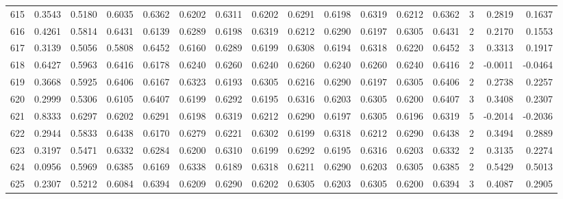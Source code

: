 \begin{tabular}{lrrrrrrrrrrrrrrr}
615 &      0.3543 &  0.5180 &  0.6035 &  0.6362 &  0.6202 &  0.6311 &  0.6202 &  0.6291 &  0.6198 &  0.6319 &   0.6212 &     0.6362 &      3 &                    0.2819 &                     0.1637 \\
616 &      0.4261 &  0.5814 &  0.6431 &  0.6139 &  0.6289 &  0.6198 &  0.6319 &  0.6212 &  0.6290 &  0.6197 &   0.6305 &     0.6431 &      2 &                    0.2170 &                     0.1553 \\
617 &      0.3139 &  0.5056 &  0.5808 &  0.6452 &  0.6160 &  0.6289 &  0.6199 &  0.6308 &  0.6194 &  0.6318 &   0.6220 &     0.6452 &      3 &                    0.3313 &                     0.1917 \\
618 &      0.6427 &  0.5963 &  0.6416 &  0.6178 &  0.6240 &  0.6260 &  0.6240 &  0.6260 &  0.6240 &  0.6260 &   0.6240 &     0.6416 &      2 &                   -0.0011 &                    -0.0464 \\
619 &      0.3668 &  0.5925 &  0.6406 &  0.6167 &  0.6323 &  0.6193 &  0.6305 &  0.6216 &  0.6290 &  0.6197 &   0.6305 &     0.6406 &      2 &                    0.2738 &                     0.2257 \\
620 &      0.2999 &  0.5306 &  0.6105 &  0.6407 &  0.6199 &  0.6292 &  0.6195 &  0.6316 &  0.6203 &  0.6305 &   0.6200 &     0.6407 &      3 &                    0.3408 &                     0.2307 \\
621 &      0.8333 &  0.6297 &  0.6202 &  0.6291 &  0.6198 &  0.6319 &  0.6212 &  0.6290 &  0.6197 &  0.6305 &   0.6196 &     0.6319 &      5 &                   -0.2014 &                    -0.2036 \\
622 &      0.2944 &  0.5833 &  0.6438 &  0.6170 &  0.6279 &  0.6221 &  0.6302 &  0.6199 &  0.6318 &  0.6212 &   0.6290 &     0.6438 &      2 &                    0.3494 &                     0.2889 \\
623 &      0.3197 &  0.5471 &  0.6332 &  0.6284 &  0.6200 &  0.6310 &  0.6199 &  0.6292 &  0.6195 &  0.6316 &   0.6203 &     0.6332 &      2 &                    0.3135 &                     0.2274 \\
624 &      0.0956 &  0.5969 &  0.6385 &  0.6169 &  0.6338 &  0.6189 &  0.6318 &  0.6211 &  0.6290 &  0.6203 &   0.6305 &     0.6385 &      2 &                    0.5429 &                     0.5013 \\
625 &      0.2307 &  0.5212 &  0.6084 &  0.6394 &  0.6209 &  0.6290 &  0.6202 &  0.6305 &  0.6203 &  0.6305 &   0.6200 &     0.6394 &      3 &                    0.4087 &                     0.2905 \\

\end{tabular}
